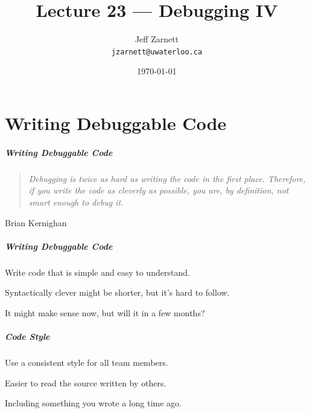 
\usepackage{alltt}

\title{Lecture 23 --- Debugging IV }

\author{Jeff Zarnett \\ \small \texttt{jzarnett@uwaterloo.ca}}
\date{\today}



\begin{frame}
  \titlepage
\end{frame}

\part{Writing Debuggable Code}
\frame{\partpage}

\begin{frame}
\frametitle{Writing Debuggable Code}
\begin{changemargin}{1cm}


\begin{quote}
	\emph{Debugging is twice as hard as writing the code in the first place. Therefore, if you write the code as cleverly as possible, you are, by definition, not smart enough to debug it.} 
\end{quote}
\hfill Brian Kernighan

\end{changemargin}
\end{frame}

\begin{frame}
\frametitle{Writing Debuggable Code}
\begin{changemargin}{1cm}

Write code that is simple and easy to understand.

Syntactically clever might be shorter, but it's hard to follow.

It might make sense now, but will it in a few months?

\end{changemargin}
\end{frame}

\begin{frame}
\frametitle{Code Style}
\begin{changemargin}{1cm}

Use a consistent style for all team members.

Easier to read the source written by others.

Including something you wrote a long time ago.

\end{changemargin}
\end{frame}

